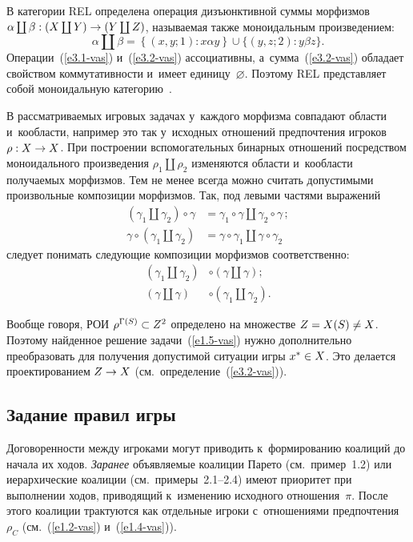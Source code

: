 \begin{multicols}{2}
    В категории REL определена операция дизъюнктивной суммы морфизмов 
     $\alpha\coprod \beta : (X\coprod Y) \hm\to (Y\coprod Z)$, на\-зы\-ва\-емая так\-же 
моноидальным произведением: 
    \begin{equation}
    \alpha\coprod\beta =\left\{ (x,y;1): x\alpha y\right\} \cup \{ (y,z;2): y\beta z\}.
    \label{e3.2-vas}
    \end{equation}
Операции~(\ref{e3.1-vas}) и~(\ref{e3.2-vas}) ас\-со\-ци\-а\-тив\-ны, а~сумма~(\ref{e3.2-vas}) 
обладает свойством коммутативности и~имеет единицу~$\varnothing$. Поэтому 
REL пред\-став\-ля\-ет собой моноидальную категорию~\cite{8-vas}.

    В рассматриваемых игровых задачах у~каж\-до\-го морфизма совпадают области 
и~кообласти, например это так у~исходных отношений предпочтения игроков $\rho: 
X\hm\to X$. При по\-стро\-ении вспомогательных бинарных отношений по\-сред\-ст\-вом 
моноидального произведения $\rho_1 \coprod\rho_2$ изменяются области 
и~кообласти по\-лу\-ча\-емых морфизмов. Тем не менее всегда можно считать 
до\-пус\-ти\-мы\-ми произвольные композиции морфизмов. Так, под левыми час\-тя\-ми 
выражений 
    \begin{align*}
    \left(\gamma_1\coprod\gamma_2\right) \circ\gamma 
&=\gamma_1\circ\gamma\coprod\gamma_2\circ\gamma\,;\\
    \gamma\circ\left(\gamma_1\coprod\gamma_2\right)&=\gamma\circ\gamma_1\coprod 
\gamma\circ \gamma_2
    \end{align*}
следует понимать сле\-ду\-ющие композиции морфизмов соответственно: 
\begin{align*}
\left(\gamma_1\coprod\gamma_2\right)&\circ\left(\gamma\coprod\gamma\right); \\
\left(\gamma\coprod\gamma\right)&\circ\left( \gamma_1\coprod\gamma_2\right).
\end{align*}
    
    Вообще говоря, РОИ $\rho^{\Gamma(S)} 
\hm\subset Z^2$ определено на множестве $Z\hm= X(S)\not= X$. Поэтому найденное 
решение задачи~(\ref{e1.5-vas}) нуж\-но дополнительно преобразовать для получения 
до\-пус\-ти\-мой ситуации игры $x^*\hm\in X$. Это делается проектированием $Z\hm\to 
X$ (см.\ определение~(\ref{e3.2-vas})). 
    
    \subsection*{Задание правил игры}

    Договоренности между игроками могут приводить к~формированию коалиций 
до начала их ходов. \textit{Заранее} объ\-яв\-ля\-емые коалиции Парето (см.\ пример~1.2) 
или иерархические коалиции (см.\ примеры~2.1--2.4) имеют приоритет при 
выполнении ходов, приводящий к~изменению исходного отношения~$\pi$. После 
этого коалиции трактуются как отдельные игроки с~отношениями 
предпочтения~$\rho_C$ (см.~(\ref{e1.2-vas}) и~(\ref{e1.4-vas})). 
    

\end{multicols}
